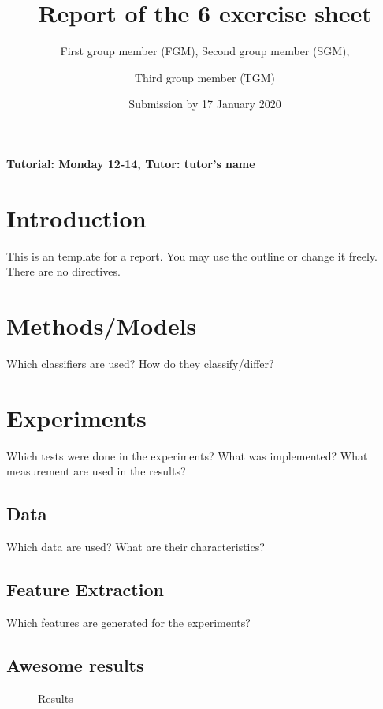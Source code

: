 \documentclass[a4paper,12pt]{article}
\title{Report of the 6\ts{th} exercise sheet}
\author{First group member (FGM), Second group member (SGM), \and
Third group member (TGM)}
\date{Submission by 17\ts{th} January 2020}
\newcommand{\initials}[1]{\marginpar{\quad\texttt{#1}}}
\begin{document}

\pagestyle{myheadings}
    
\maketitle

\begin{center}
    \textbf{Tutorial: Monday 12-14, Tutor: tutor's name}
\end{center}

\section{Introduction}
This is an template for a report. You may use the outline or change it freely. There are no directives.


\section{Methods/Models}
Which classifiers are used? How do they classify/differ?
\initials{FGM}

\section{Experiments}
Which tests were done in the experiments? What was implemented? What measurement are used in the results?
\subsection{Data}
Which data are used? What are their characteristics?
\initials{SGM}

\subsection{Feature Extraction}
Which features are generated for the experiments?
\initials{TGM}

\subsection{Awesome results}

\begin{figure}[h]
\centering
\caption{Results}
\label{fig_res}
\end{figure}
\end{document}

